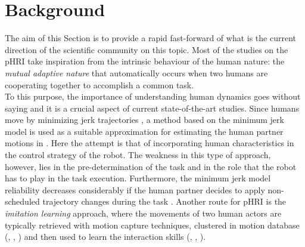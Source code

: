 
\section{Background}
%
The aim of this Section is to provide a rapid fast-forward of what is the current
 direction of the scientific community on this topic.  Most of the
  studies on the pHRI take inspiration from the intrinsic behaviour of the human nature:
   the \emph{mutual adaptive nature} that automatically occurs when two
    humans are cooperating together to accomplish a common task.  
	\\
	\indent
To this purpose, the importance of understanding human dynamics goes without saying and it is 
a crucial aspect of current state-of-the-art studies. Since humans
 move by minimizing jerk trajectories \cite{Flash1985},
 a method based on the minimum jerk model is used as a suitable approximation 
 for estimating the human partner motions in \cite{Maeda2001}. Here the attempt is that of
  incorporating human
  characteristics in the control strategy of the robot. The weakness in  this type of approach,
   however, lies in the pre-determination of the task and in the role that the robot has to
    play in the task execution.
   Furthermore, the minimum jerk model reliability decreases considerably if the human partner
    decides to apply non-scheduled trajectory changes during the task \cite{Miossec2009}.
	  Another route for pHRI is the \emph{imitation learning} approach, 
	  where the movements of two 
	 human actors are typically retrieved with motion capture techniques, clustered in motion
	  database (\cite{Guerra2011}, \cite{Kuehne2011}, \cite{Wojtusch2015}) and then used to 
	 learn the interaction skills (\cite{Amor2014}, \cite{Tamim2014}, \cite{Tamim2016}).
%

